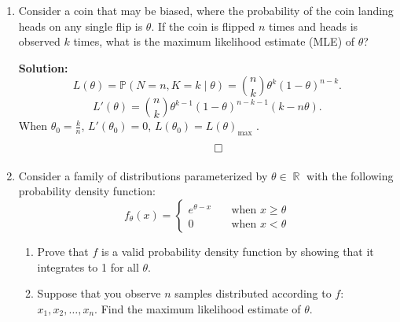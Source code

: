 \documentclass{article}
\DeclareMathOperator{\R}{\mathbb{R}}
\newenvironment{solution}{\color{blue} \smallskip \textbf{Solution:}}{}
\begin{document}
\begin{enumerate}
    \begin{solution}
        \begin{align*}
        {\mathbb{P}(X = k \,|\, X+Y=n)} &= 
        \frac{e^{-\lambda}\frac{\lambda^k}{k!}e^{-\mu}\frac{\mu^{n-k}}{(n-k)!}}
             {\sum_{i=0}^n e^{-\lambda}\frac{\lambda^i}{i!}e^{-\mu}\frac{\mu^{n-i}}{(n-i)!}} \\
        &= 
        \frac{\frac{\lambda^k}{k!}\frac{\mu^{n-k}}{(n-k)!}(n!)}
             {\sum_{i=0}^n \frac{\lambda^i}{i!}\frac{\mu^{n-i}}{(n-i)!}(n!)} \\
        &=
        \frac{\binom{n}{k}\lambda^k\mu^{n-k}}
             {\sum_{i=0}^n \binom{n}{i}\lambda^i\mu^{n-i}} \\
        &= 
        \frac{\binom{n}{k}(\frac{\lambda}{\lambda+\mu})^k(\frac{\mu}{\lambda+\mu})^{n-k}}
             {\sum_{i=0}^n \binom{n}{i}(\frac{\lambda}{\lambda+\mu})^i(\frac{\mu}{\lambda+\mu})^{n-i}} \\
        &= \binom{n}{k}(\frac{\lambda}{\lambda+\mu})^k(\frac{\mu}{\lambda+\mu})^{n-k}.
        \end{align*}
        It is binomial distribution $B(n, \frac{\lambda}{\lambda+\mu})$.
        \[ \qedhere\]
    \end{solution}

    \item
    Consider a coin that may be biased, where the probability of the coin landing heads on any single flip is $\theta$. 
    If the coin is flipped $n$ times and heads is observed $k$ times, what is the maximum likelihood estimate (MLE) of $\theta$?

    \begin{solution}
        $$
        L(\theta) = \mathbb{P}(N = n, K = k \mid \theta) = \binom{n}{k} \theta^k (1-\theta)^{n-k}.
        $$
        $$
        L'(\theta) = \binom{n}{k} \theta^{k-1}(1-\theta)^{n-k-1}(k - n\theta).
        $$
        When $\theta_0 = \frac{k}{n}$, $L'(\theta_0) = 0$, $L(\theta_0) = L(\theta)_{\max}$ .
        \[ \qedhere \]
    \end{solution}

    \item 
    Consider a family of distributions parameterized by $\theta \in \R$ with the following probability density function:
    \[
        f_{\theta}(x) = \begin{cases}
            e^{\theta - x} \quad &\text{when } x \geq \theta \\
            0 \quad &\text{when } x < \theta
        \end{cases}
    \]
    \begin{enumerate}
        \item Prove that $f$ is a valid probability density function by showing that it integrates to 1 for all $\theta$.
        \item Suppose that you observe $n$ samples distributed according to $f$: $x_{1}, x_{2}, \ldots, x_{n}$. Find the maximum likelihood estimate of $\theta$.
    \end{enumerate}


\end{enumerate}
\end{document}

